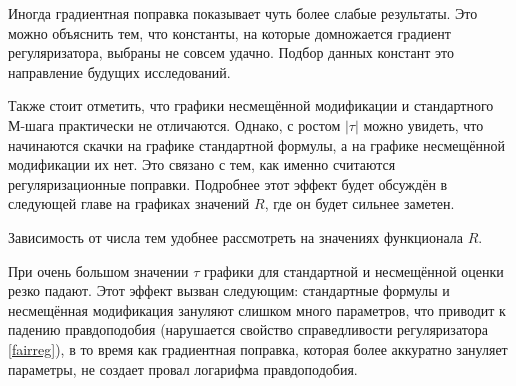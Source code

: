 \documentclass[12pt]{article}
\begin{document}
Иногда градиентная поправка показывает чуть более слабые результаты. Это можно объяснить тем, что константы, на которые домножается градиент регуляризатора, выбраны не совсем удачно. Подбор данных констант это направление будущих исследований. 

Также стоит отметить, что  графики несмещённой модификации и стандартного М-шага практически не отличаются. Однако, с ростом $|\tau|$ можно увидеть, что начинаются скачки на графике стандартной формулы, а на графике несмещённой модификации их нет. Это связано с тем, как именно считаются регуляризационные поправки. Подробнее этот эффект будет обсуждён в следующей главе на графиках значений $R$, где он будет сильнее заметен.

Зависимость от числа тем  удобнее рассмотреть на значениях функционала $R$.

При очень большом значении $\tau$ графики для стандартной и несмещённой оценки резко падают. Этот эффект вызван следующим: стандартные формулы и несмещённая модификация зануляют слишком много параметров, что приводит к падению правдоподобия (нарушается свойство справедливости регуляризатора \ref{fairreg}), в то время как градиентная поправка, которая более аккуратно зануляет параметры, не создает провал логарифма правдоподобия.
\end{document}
